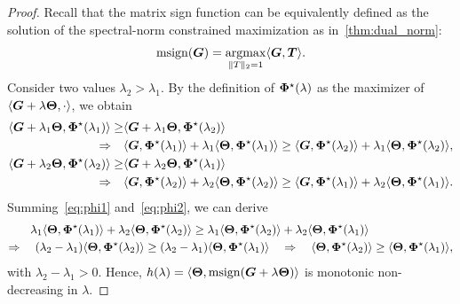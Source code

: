 \begin{proof}
    Recall that the matrix sign function can be equivalently defined as the solution of the spectral-norm constrained maximization as in~\cref{thm:dual_norm}:
    \begin{equation}
        \operatorname{msign}({\bm{G}}) = \underset{\|T\|_2=1}{\operatorname*{argmax}}\langle {\bm{G}}, {\bm{T}} \rangle.
    \end{equation}
    Consider two values $\lambda_{2} > \lambda_{1}$. By the definition of ${\bm{\Phi}}^{\star}(\lambda)$ as the maximizer of $\langle {\bm{G}} + \lambda {\bm{\Theta}}, \cdot \rangle$, we
    obtain
    \begin{align}
        \langle {\bm{G}} + \lambda_{1} {\bm{\Theta}},{\bm{\Phi}}^{\star}(\lambda_{1}) \rangle \geq & \langle {\bm{G}} + \lambda_{1} {\bm{\Theta}},{\bm{\Phi}}^{\star}(\lambda_{2}) \rangle \tag*{} \\
        \Rightarrow\quad                                                               & \langle {\bm{G}} ,{\bm{\Phi}}^{\star}(\lambda_{1}) \rangle + \lambda_{1}\langle {\bm{\Theta}},{\bm{\Phi}}^{\star}(\lambda_{1}) \rangle \geq \langle {\bm{G}} ,{\bm{\Phi}}^{\star}(\lambda_{2}) \rangle + \lambda_{1}\langle {\bm{\Theta}},{\bm{\Phi}}^{\star}(\lambda_{2})\rangle,\label{eq:phi1} \\
        \langle {\bm{G}} + \lambda_{2} {\bm{\Theta}},{\bm{\Phi}}^{\star}(\lambda_{2}) \rangle \geq & \langle {\bm{G}} + \lambda_{2} {\bm{\Theta}},{\bm{\Phi}}^{\star}(\lambda_{1}) \rangle \tag*{} \\
        \Rightarrow\quad                                                               & \langle {\bm{G}} ,{\bm{\Phi}}^{\star}(\lambda_{2}) \rangle + \lambda_{2}\langle {\bm{\Theta}},{\bm{\Phi}}^{\star}(\lambda_{2})\rangle\geq \langle {\bm{G}} ,{\bm{\Phi}}^{\star}(\lambda_{1}) \rangle+\lambda_{2}\langle {\bm{\Theta}},{\bm{\Phi}}^{\star}(\lambda_{1})\rangle.\label{eq:phi2}
    \end{align}
    Summing~\cref{eq:phi1} and~\cref{eq:phi2}, we can derive
    \begin{align}
     \lambda_{1}\langle {\bm{\Theta}},{\bm{\Phi}}^{\star}(\lambda_{1})\rangle + \lambda_{2}\langle {\bm{\Theta}},{\bm{\Phi}}^{\star}(\lambda_{2})\rangle \geq \lambda_{1}\langle {\bm{\Theta}},{\bm{\Phi}}^{\star}(\lambda_{2})\rangle &+ \lambda_{2}\langle {\bm{\Theta}},{\bm{\Phi}}^{\star}(\lambda_{1})\rangle
     \\
     \Rightarrow\quad
        (\lambda_{2} - \lambda_{1}) \langle {\bm{\Theta}},{\bm{\Phi}}^{\star}(\lambda_{2}) \rangle
        \geq (\lambda_{2} - \lambda_{1}) \langle {\bm{\Theta}},{\bm{\Phi}}^{\star}(\lambda
        _{1}) \rangle\quad &\Rightarrow\quad  \langle {\bm{\Theta}}, {\bm{\Phi}}^{\star}(\lambda_{2}) \rangle
        \geq \langle {\bm{\Theta}}, {\bm{\Phi}}^{\star}(\lambda_{1}) \rangle,
    \end{align}
    with $\lambda_{2}-\lambda_{1}>0$. Hence, $h(\lambda) = \langle {\bm{\Theta}}, \operatorname{msign}({\bm{G}} + \lambda {\bm{\Theta}}) \rangle$ is monotonic non-decreasing in $\lambda$.
\end{proof}

